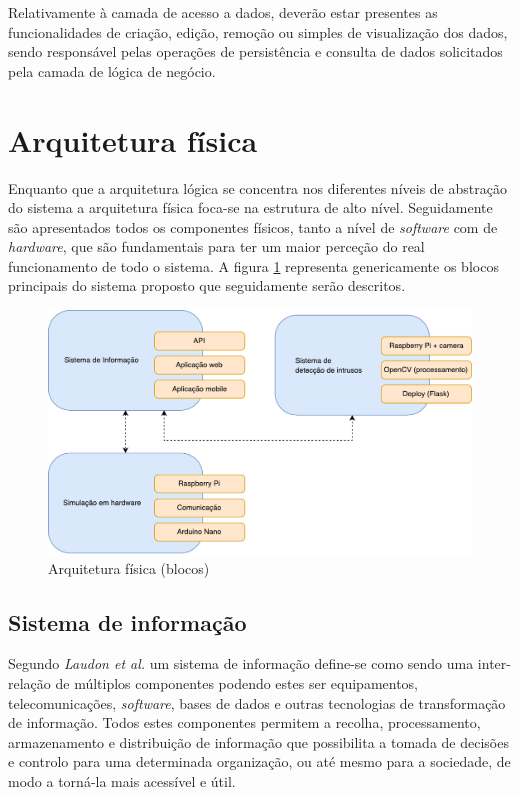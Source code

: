 Relativamente à camada de acesso a dados, deverão estar presentes as funcionalidades de criação, edição, remoção ou simples de visualização dos dados, sendo responsável pelas operações de persistência e consulta de dados solicitados pela camada de lógica de negócio.


\section{Arquitetura física}


Enquanto que a arquitetura lógica se concentra nos diferentes níveis de abstração do sistema a arquitetura física foca-se na estrutura de alto nível.  
Seguidamente são apresentados todos os componentes físicos, tanto  a nível de \textit{software} com de \textit{hardware}, que são fundamentais para ter um maior perceção do real funcionamento de todo o sistema. 
A figura \ref{fisicablocos} representa genericamente os blocos principais do sistema proposto que seguidamente serão descritos. 


\begin{figure}[h]
	\centering
	\includegraphics[scale=0.51]{esquemas/esquema-blocos.pdf}
	\caption{Arquitetura física (blocos)}
	\label{fisicablocos}
\end{figure}


  
\subsection{Sistema de informação}


Segundo \textit{Laudon et al.}\cite{Laudon1998} um sistema de informação define-se como sendo uma inter-relação de múltiplos componentes podendo estes ser equipamentos, telecomunicações, \textit{software}, bases de dados e outras tecnologias de transformação de informação. Todos estes componentes permitem a recolha, processamento, armazenamento e distribuição de informação que possibilita a tomada de decisões e controlo para uma determinada organização, ou até mesmo para a sociedade, de modo a torná-la mais acessível e útil.

